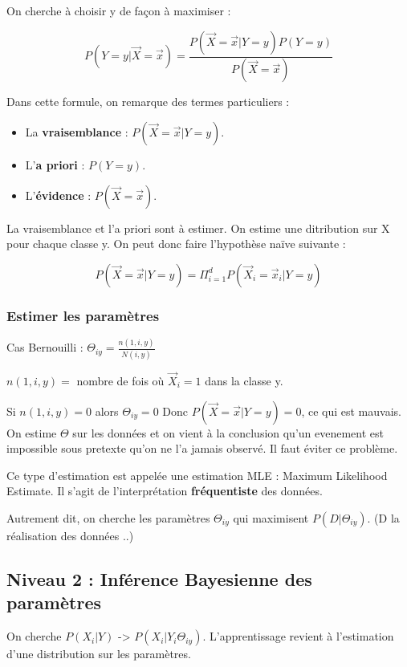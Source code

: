 \documentclass{article}
\begin{document}
On cherche à choisir y de façon à maximiser : 

\[ P(Y=y | \vec{X} = \vec{x}) = \frac{P(\vec{X} = \vec{x} | Y=y)P(Y=y)}{P(\vec{X} = \vec{x})} \]

Dans cette formule, on remarque des termes particuliers : 

\begin{itemize}

\item La \textbf{vraisemblance} : $P(\vec{X} = \vec{x} | Y = y)$.
\item L'\textbf{a priori} : $P(Y = y)$.
\item L'\textbf{évidence} : $P(\vec{X} = \vec{x})$.

\end{itemize}

La vraisemblance et l'a priori sont à estimer. On estime une ditribution sur X pour chaque classe y.
On peut donc faire l'hypothèse naïve suivante : 

\[ P(\vec{X}=\vec{x} | Y=y) = \Pi_{i=1}^{d} P(\vec{X}_i = \vec{x}_i | Y = y) \]

\subsubsection*{Estimer les paramètres}

Cas Bernouilli : $\Theta_{iy} = \frac{n(1, i, y)}{N(i, y)}$

$ n(1, i, y) =$ nombre de fois où $\vec{X}_i = 1$ dans la classe y.

Si $n(1, i, y) = 0$ alors $\Theta_{iy} = 0$
Donc $P(\vec{X} = \vec{x} | Y = y) = 0$, ce qui est mauvais. On estime $\Theta$ sur les données et on vient à la conclusion qu'un evenement est impossible sous pretexte qu'on ne l'a jamais observé. Il faut éviter ce problème.

Ce type d'estimation est appelée une estimation MLE : Maximum Likelihood Estimate. Il s'agit de l'interprétation \textbf{fréquentiste} des données.

Autrement dit, on cherche les paramètres $\Theta_{iy}$ qui maximisent $P(D | \Theta_{iy})$. (D la réalisation des données ..)

\subsection{Niveau 2 : Inférence Bayesienne des paramètres}

On cherche $P(X_i | Y)$ -> $P(X_i | Y_i \Theta_{iy})$. L'apprentissage revient à l'estimation d'une distribution sur les paramètres.
\end{document}
